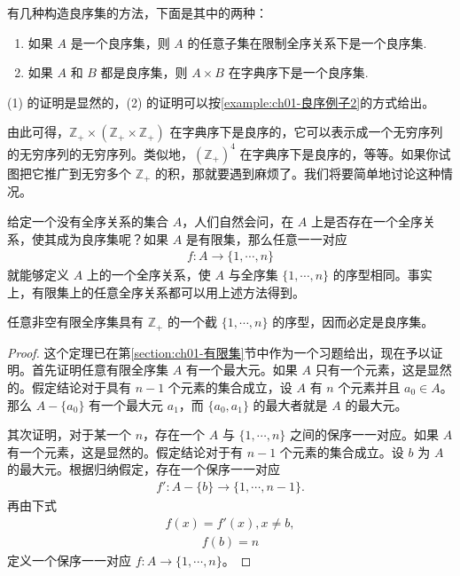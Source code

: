 \documentclass[../../main.tex]{subfiles}
\begin{document}
有几种构造良序集的方法，下面是其中的两种：
\begin{enumerate}[(1)]
\item 如果 $A$ 是一个良序集，则 $A$ 的任意子集在限制全序关系下是一个良序集.
\item 如果 $A$ 和 $B$ 都是良序集，则 $A \times B$ 在字典序下是一个良序集.
\end{enumerate}
(1) 的证明是显然的，(2) 的证明可以按\cref{example:ch01-良序例子2}的方式给出。

由此可得，$\mathbb{Z}_{+} \times (\mathbb{Z}_{+} \times \mathbb{Z}_{+})$ 在字典序下是良序的，它可以表示成一个无穷序列的无穷序列的无穷序列。类似地，$(\mathbb{Z}_{+})^{4}$ 在字典序下是良序的，等等。如果你试图把它推广到无穷多个 $\mathbb{Z}_{+}$ 的积，那就要遇到麻烦了。我们将要简单地讨论这种情况。

给定一个没有全序关系的集合 $A$，人们自然会问，在 $A$ 上是否存在一个全序关系，使其成为良序集呢？如果 $A$ 是有限集，那么任意一一对应
\begin{align*}
f: A \longrightarrow \{1, \cdots, n\}
\end{align*}
就能够定义 $A$ 上的一个全序关系，使 $A$ 与全序集 $\{1, \cdots, n\}$ 的序型相同。事实上，有限集上的任意全序关系都可以用上述方法得到。

\begin{theorem}[有限全序集的序型]\label{theorem:ch01-有限良序}
任意非空有限全序集具有 $\mathbb{Z}_{+}$ 的一个截 $\{1, \cdots, n\}$ 的序型，因而必定是良序集。
\end{theorem}

\begin{proof}
这个定理已在第\cref{section:ch01-有限集}节中作为一个习题给出，现在予以证明。首先证明任意有限全序集 $A$ 有一个最大元。如果 $A$ 只有一个元素，这是显然的。假定结论对于具有 $n-1$ 个元素的集合成立，设 $A$ 有 $n$ 个元素并且 $a_{0} \in A$。那么 $A - \{a_{0}\}$ 有一个最大元 $a_{1}$，而 $\{a_{0}, a_{1}\}$ 的最大者就是 $A$ 的最大元。

其次证明，对于某一个 $n$，存在一个 $A$ 与 $\{1, \cdots, n\}$ 之间的保序一一对应。如果 $A$ 有一个元素，这是显然的。假定结论对于有 $n-1$ 个元素的集合成立。设 $b$ 为 $A$ 的最大元。根据归纳假定，存在一个保序一一对应
\begin{align*}
f': A - \{b\} \longrightarrow \{1, \cdots, n-1\}.
\end{align*}
再由下式
\begin{align*}
f(x) = f'(x), x \neq b,
\end{align*}
\begin{align*}
f(b) = n
\end{align*}
定义一个保序一一对应 $f: A \longrightarrow \{1, \cdots, n\}$。
\end{proof}
\end{document}
